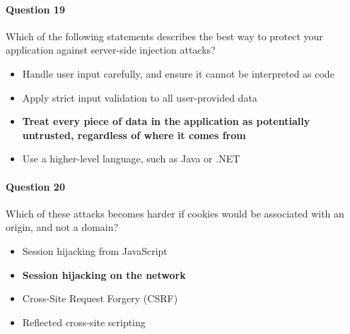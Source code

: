 \documentclass[titlepage]{article}
\begin{document}
    \paragraph{Question 19} Which of the following statements describes the best way to protect your application against server-side injection attacks?
    \begin{itemize}
        \item Handle user input carefully, and ensure it cannot be interpreted as code
        \item Apply strict input validation to all user-provided data
        \item \textbf{Treat every piece of data in the application as potentially untrusted, regardless of where it comes from} \checkmark
        \item Use a higher-level language, such as Java or .NET
    \end{itemize}
    \paragraph{Question 20} Which of these attacks becomes harder if cookies would be associated with an origin, and not a domain?
    \begin{itemize}
        \item Session hijacking from JavaScript
        \item \textbf{Session hijacking on the network} \checkmark
        \item Cross-Site Request Forgery (CSRF)
        \item Reflected cross-site scripting
    \end{itemize}
    
\end{document}
